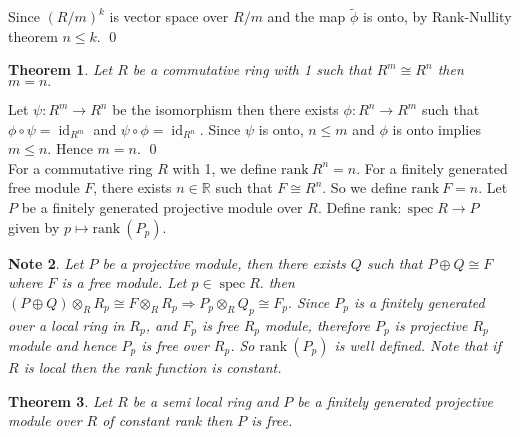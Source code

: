\documentclass[11pt]{amsart}
\newtheorem{theorem}{Theorem}[section]
\newtheorem{note}[theorem]{Note}
\newcommand{\RR}{\mathbb R}
\newcommand\isom{\mathrel{\stackon[-0.1ex]{\makebox*{\scalebox{1.08}{\AC}}{=\hfill\llap{=}}}{{\AC}}}}
\newcommand\nvisom{\rotatebox[origin=cc] {-90}{$ \isom $}}
\newcommand{\rk}[1]{\text{rank}~#1}
\DeclareMathOperator{\Ker}{\text{Ker}}
\DeclareMathOperator{\spec}{\text{spec}}
\DeclareMathOperator{\id}{\text{id}}
\begin{document}
\begin{center}


\end{center}

Since $(R/m)^k$ is vector space over $R/m$ and the map $\tilde{\phi}$ is onto, by Rank-Nullity theorem $n\leq k.$ \qed

\begin{theorem}

Let $R$ be a commutative ring with 1 such that $R^m\cong R^n$ then $m=n.$

\end{theorem}

\proof Let $\psi:R^m\to R^n$ be the isomorphism then there exists $\phi:R^n\to R^m$ such that $\phi\circ \psi=\id_{R^m}$ and $\psi\circ \phi=\id_{R^n}.$ Since $\psi$ is onto, $n\leq m$ and $\phi$ is onto implies $m\leq n.$ Hence $m=n.$ \qed \\

For a commutative ring $R$ with 1, we define $\rk{R^n}=n$. For a finitely generated free module $F$, there exists $n\in {\RR}$ such that $F\cong R^n$. So we define $\rk{F}=n.$ Let $P$ be a finitely generated projective module over $R.$ Define $\text{rank}:\spec R\to P$ given by $p\mapsto \rk{(P_p)}.$ 
 
\begin{note}

Let $P$ be a projective module, then there exists $Q$ such that $P\oplus Q\cong F$ where $F$ is a free module. Let $p\in \spec R.$ then $(P\oplus Q)\otimes_R R_p\cong F\otimes_R R_p \Rightarrow P_p\otimes_R Q_p\cong F_p.$ Since $P_p$ is a finitely generated over a local ring in $R_p$, and $F_p$ is free $R_p$ module, therefore $P_p$ is projective $R_p$ module and hence $P_p$ is free over $R_p$. So $\rk{(P_p)}$ is well defined. Note that if $R$ is local then the rank function is constant.

\end{note}

\begin{theorem}

Let $R$ be a semi local ring and $P$ be a finitely generated projective module over $R$ of constant rank then $P$ is free.

\end{theorem}
\end{document}
